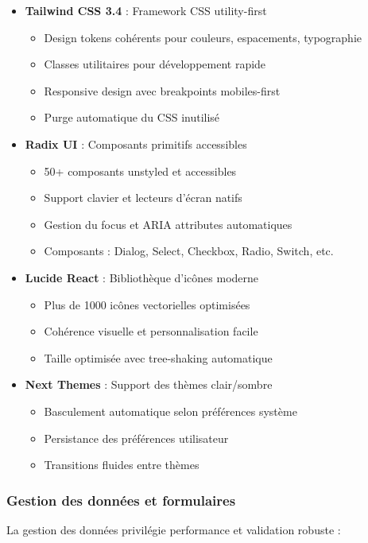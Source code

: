 \documentclass[12pt,a4paper]{report}
\begin{document}
\begin{itemize}
\item \textbf{Tailwind CSS 3.4} : Framework CSS utility-first
  \begin{itemize}
  \item Design tokens cohérents pour couleurs, espacements, typographie
  \item Classes utilitaires pour développement rapide
  \item Responsive design avec breakpoints mobiles-first
  \item Purge automatique du CSS inutilisé
  \end{itemize}

\item \textbf{Radix UI} : Composants primitifs accessibles
  \begin{itemize}
  \item 50+ composants unstyled et accessibles
  \item Support clavier et lecteurs d'écran natifs
  \item Gestion du focus et ARIA attributes automatiques
  \item Composants : Dialog, Select, Checkbox, Radio, Switch, etc.
  \end{itemize}

\item \textbf{Lucide React} : Bibliothèque d'icônes moderne
  \begin{itemize}
  \item Plus de 1000 icônes vectorielles optimisées
  \item Cohérence visuelle et personnalisation facile
  \item Taille optimisée avec tree-shaking automatique
  \end{itemize}

\item \textbf{Next Themes} : Support des thèmes clair/sombre
  \begin{itemize}
  \item Basculement automatique selon préférences système
  \item Persistance des préférences utilisateur
  \item Transitions fluides entre thèmes
  \end{itemize}
\end{itemize}

\subsubsection{Gestion des données et formulaires}
La gestion des données privilégie performance et validation robuste :
\end{document}

